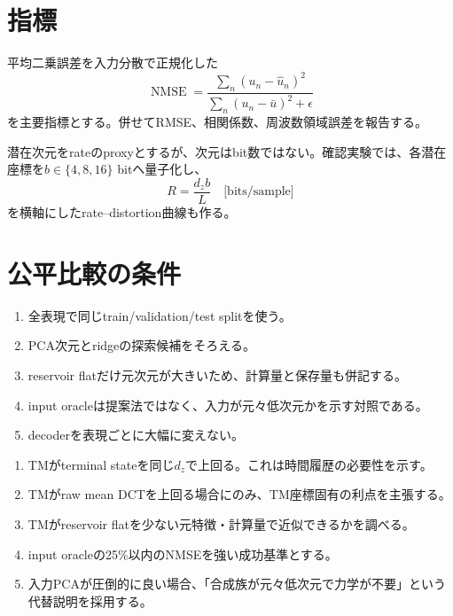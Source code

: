 \documentclass[a4paper,11pt,oneside,openany]{ltjsbook}
\newcommand{\NMSE}{\ensuremath{\operatorname{NMSE}}}
\begin{document}
\section{指標}

平均二乗誤差を入力分散で正規化した
\begin{equation}
  \NMSE{}
  =\frac{\sum_{n}(u_n-\widehat u_n)^2}
  {\sum_n(u_n-\bar u)^2+\epsilon}
  \label{eq:nmse}
\end{equation}
を主要指標とする。併せてRMSE、相関係数、周波数領域誤差を報告する。

潜在次元をrateのproxyとするが、次元はbit数ではない。確認実験では、各潜在座標を\(b\in\{4,8,16\}\) bitへ量子化し、
\begin{equation}
  R=\frac{d_zb}{L}
  \quad\text{[bits/sample]}
  \label{eq:bit_rate_proxy}
\end{equation}
を横軸にしたrate--distortion曲線も作る。

\section{公平比較の条件}

\begin{enumerate}
  \item 全表現で同じtrain/validation/test splitを使う。
  \item PCA次元とridgeの探索候補をそろえる。
  \item reservoir flatだけ元次元が大きいため、計算量と保存量も併記する。
  \item input oracleは提案法ではなく、入力が元々低次元かを示す対照である。
  \item decoderを表現ごとに大幅に変えない。
\end{enumerate}

\begin{gatebox}
\begin{enumerate}
  \item TMがterminal stateを同じ\(d_z\)で上回る。これは時間履歴の必要性を示す。
  \item TMがraw mean DCTを上回る場合にのみ、TM座標固有の利点を主張する。
  \item TMがreservoir flatを少ない元特徴・計算量で近似できるかを調べる。
  \item input oracleの25\%以内のNMSEを強い成功基準とする。
  \item 入力PCAが圧倒的に良い場合、「合成族が元々低次元で力学が不要」という代替説明を採用する。
\end{enumerate}
\end{gatebox}
\end{document}
